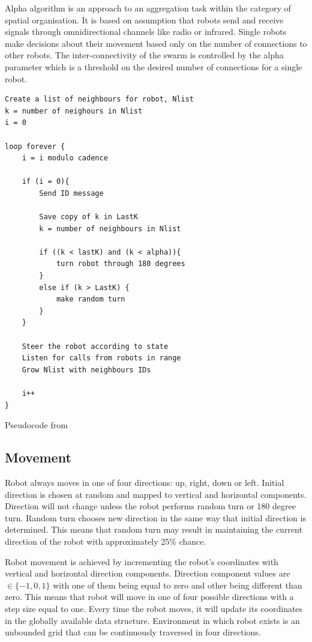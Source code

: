 \documentclass{article}
\begin{document}
Alpha algorithm is an approach to an aggregation task within the category of spatial organisation. It is based on assumption that robots send and receive signals through omnidirectional channels like radio or infrared. Single robots make decisions about their movement based only on the number of connections to other robots. The inter-connectivity of the swarm is controlled by the alpha parameter which is a threshold on the desired number of connections for a single robot. 

\newpage
\begin{lstlisting}
Create a list of neighbours for robot, Nlist
k = number of neighours in Nlist
i = 0

loop forever {
	i = i modulo cadence

	if (i = 0){
		Send ID message

		Save copy of k in LastK
		k = number of neighbours in Nlist

		if ((k < lastK) and (k < alpha)){
			turn robot through 180 degrees
		}
		else if (k > LastK) {
			make random turn
		}
	}

	Steer the robot according to state
	Listen for calls from robots in range
	Grow Nlist with neighbours IDs

	i++
}
\end{lstlisting}
Pseudocode from \cite{Minimalist_Coherent_Swarming_of_Wireless_Networked_Autonomous_Mobile_Robots}

\subsection{Movement}
Robot always moves in one of four directions: up, right, down or left. Initial direction is chosen at random and mapped to vertical and horizontal components. Direction will not change unless the robot performs random turn or 180 degree turn. Random turn chooses new direction in the same way that initial direction is determined. This means that random turn may result in maintaining the current direction of the robot with approximately 25\% chance. 

Robot movement is achieved by incrementing the robot's coordinates with vertical and horizontal direction components. Direction component values are  $\in \{-1, 0, 1\}$ with one of them being equal to zero and other being different than zero. This means that robot will move in one of four possible directions with a step size equal to one. Every time the robot moves, it will update its coordinates in the globally available data structure. Environment in which robot exists is an unbounded grid that can be continuously traversed in four directions.
\end{document}
